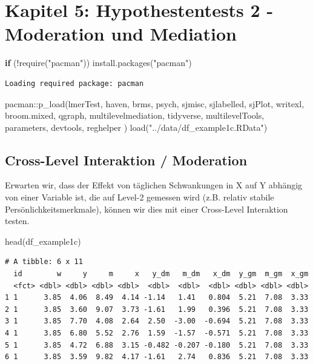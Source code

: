 \documentclass[
  letterpaper,
  DIV=11,
  numbers=noendperiod]{scrreprt}
\newenvironment{Shaded}{\begin{snugshade}}{\end{snugshade}}
\newcommand{\ControlFlowTok}[1]{\textcolor[rgb]{0.00,0.23,0.31}{\textbf{#1}}}
\newcommand{\FunctionTok}[1]{\textcolor[rgb]{0.28,0.35,0.67}{#1}}
\newcommand{\NormalTok}[1]{\textcolor[rgb]{0.00,0.23,0.31}{#1}}
\newcommand{\SpecialCharTok}[1]{\textcolor[rgb]{0.37,0.37,0.37}{#1}}
\newcommand{\StringTok}[1]{\textcolor[rgb]{0.13,0.47,0.30}{#1}}
\begin{document}
\chapter{Kapitel 5: Hypothestentests 2 - Moderation und
Mediation}\label{kapitel-5-hypothestentests-2---moderation-und-mediation}

\begin{Shaded}
\begin{Highlighting}[]
\ControlFlowTok{if}\NormalTok{ (}\SpecialCharTok{!}\FunctionTok{require}\NormalTok{(}\StringTok{"pacman"}\NormalTok{)) }\FunctionTok{install.packages}\NormalTok{(}\StringTok{"pacman"}\NormalTok{)}
\end{Highlighting}
\end{Shaded}

\begin{verbatim}
Loading required package: pacman
\end{verbatim}

\begin{Shaded}
\begin{Highlighting}[]
\NormalTok{pacman}\SpecialCharTok{::}\FunctionTok{p\_load}\NormalTok{(lmerTest, haven, brms, psych,}
\NormalTok{               sjmisc, sjlabelled, sjPlot, writexl, broom.mixed, qgraph,}
\NormalTok{               multilevelmediation,}
\NormalTok{               tidyverse, multilevelTools, parameters, devtools, reghelper}
\NormalTok{               )}
\FunctionTok{load}\NormalTok{(}\StringTok{"../data/df\_example1c.RData"}\NormalTok{)}
\end{Highlighting}
\end{Shaded}

\section{Cross-Level Interaktion /
Moderation}\label{cross-level-interaktion-moderation}

Erwarten wir, dass der Effekt von täglichen Schwankungen in X auf Y
abhängig von einer Variable ist, die auf Level-2 gemessen wird (z.B.
relativ stabile Persönlichkeitsmerkmale), können wir dies mit einer
Cross-Level Interaktion testen.

\begin{Shaded}
\begin{Highlighting}[]
\FunctionTok{head}\NormalTok{(df\_example1c)}
\end{Highlighting}
\end{Shaded}

\begin{verbatim}
# A tibble: 6 x 11
  id        w     y     m     x   y_dm   m_dm   x_dm  y_gm  m_gm  x_gm
  <fct> <dbl> <dbl> <dbl> <dbl>  <dbl>  <dbl>  <dbl> <dbl> <dbl> <dbl>
1 1      3.85  4.06  8.49  4.14 -1.14   1.41   0.804  5.21  7.08  3.33
2 1      3.85  3.60  9.07  3.73 -1.61   1.99   0.396  5.21  7.08  3.33
3 1      3.85  7.70  4.08  2.64  2.50  -3.00  -0.694  5.21  7.08  3.33
4 1      3.85  6.80  5.52  2.76  1.59  -1.57  -0.571  5.21  7.08  3.33
5 1      3.85  4.72  6.88  3.15 -0.482 -0.207 -0.180  5.21  7.08  3.33
6 1      3.85  3.59  9.82  4.17 -1.61   2.74   0.836  5.21  7.08  3.33
\end{verbatim}
\end{document}

